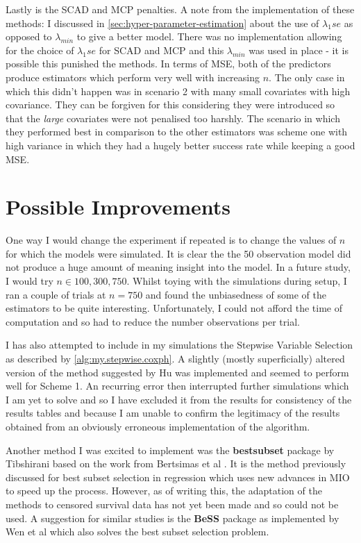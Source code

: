Lastly is the SCAD and MCP penalties. A note from the implementation of these methods: I discussed in \cref{sec:hyper-parameter-estimation} about the use of $\lambda_1se$ as opposed to $\lambda_{min}$ to give a better model. There was no implementation allowing for the choice of $\lambda_1se$ for SCAD and MCP and this $\lambda_{min}$ was used in place - it is possible this punished the methods. In terms of MSE, both of the predictors produce estimators which perform very well with increasing $n$. The only case in which this didn't happen was in scenario 2 with many small covariates with high covariance. They can be forgiven for this considering they were introduced so that the \emph{large} covariates were not penalised too harshly. The scenario in which they performed best in comparison to the other estimators was scheme one with high variance in which they had a hugely better success rate while keeping a good MSE.

\section{Possible Improvements}\label{sec:improvements}

One way I would change the experiment if repeated is to change the values of $n$ for which the models were simulated. It is clear the the 50 observation model did not produce a huge amount of meaning insight into the model. In a future study, I would try $n\in{100,300,750}$. Whilst toying with the simulations during setup, I ran a couple of trials at $n=750$ and found the unbiasedness of some of the estimators to be quite interesting. Unfortunately, I could not afford the time of computation and so had to reduce the number observations per trial.

I has also attempted to include in my simulations the Stepwise Variable Selection as described by \cref{alg:my.stepwise.coxph}. A slightly (mostly superficially) altered version of the method suggested by Hu  was implemented and seemed to perform well for Scheme 1. An recurring error then interrupted further simulations which I am yet to solve and so I have excluded it from the results for consistency of the results tables and because I am unable to confirm the legitimacy of the results obtained from an obviously erroneous implementation of the algorithm.

Another method I was excited to implement was the \textbf{bestsubset} package by Tibshirani  based on the work from Bertsimas et al . It is the method previously discussed for best subset selection in regression which uses new advances in MIO to speed up the process. However, as of writing this, the adaptation of the methods to censored survival data has not yet been made and so could not be used. A suggestion for similar studies is the \textbf{BeSS} package as implemented by Wen et al  which also solves the best subset selection problem.

